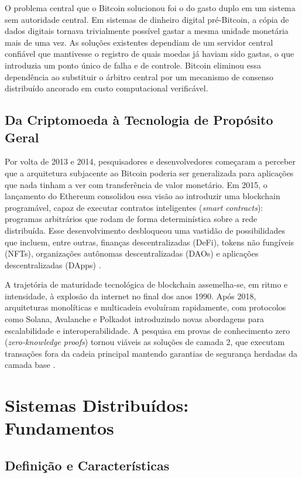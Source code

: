 \documentclass[12pt,a4paper]{report}
\begin{document}
O problema central que o Bitcoin solucionou foi o do gasto duplo em um sistema sem autoridade central. Em sistemas de dinheiro digital pré-Bitcoin, a cópia de dados digitais tornava trivialmente possível gastar a mesma unidade monetária mais de uma vez. As soluções existentes dependiam de um servidor central confiável que mantivesse o registro de quais moedas já haviam sido gastas, o que introduzia um ponto único de falha e de controle. Bitcoin eliminou essa dependência ao substituir o árbitro central por um mecanismo de consenso distribuído ancorado em custo computacional verificável.

\subsection{Da Criptomoeda à Tecnologia de Propósito Geral}

Por volta de 2013 e 2014, pesquisadores e desenvolvedores começaram a perceber que a arquitetura subjacente ao Bitcoin poderia ser generalizada para aplicações que nada tinham a ver com transferência de valor monetário. Em 2015, o lançamento do Ethereum consolidou essa visão ao introduzir uma blockchain programável, capaz de executar contratos inteligentes (\textit{smart contracts}): programas arbitrários que rodam de forma determinística sobre a rede distribuída. Esse desenvolvimento desbloqueou uma vastidão de possibilidades que incluem, entre outras, finanças descentralizadas (DeFi), tokens não fungíveis (NFTs), organizações autônomas descentralizadas (DAOs) e aplicações descentralizadas (DApps) \cite{Bashir2023}.

A trajetória de maturidade tecnológica de blockchain assemelha-se, em ritmo e intensidade, à explosão da internet no final dos anos 1990. Após 2018, arquiteturas monolíticas e multicadeia evoluíram rapidamente, com protocolos como Solana, Avalanche e Polkadot introduzindo novas abordagens para escalabilidade e interoperabilidade. A pesquisa em provas de conhecimento zero (\textit{zero-knowledge proofs}) tornou viáveis as soluções de camada 2, que executam transações fora da cadeia principal mantendo garantias de segurança herdadas da camada base \cite{Bashir2023}.

\section{Sistemas Distribuídos: Fundamentos}

\subsection{Definição e Características}
\end{document}
